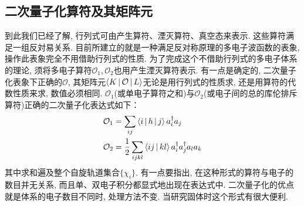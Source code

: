 \subsection{二次量子化算符及其矩阵元}
\label{sec2.4.2}
到此我们已经了解, 行列式可由产生算符、湮灭算符、真空态来表示. 这些算符满足一组反対易关系. 目前所建立的就是一种满足反对称原理的多电子波函数的表象, 操作此表象完全不用借助行列式的性质. 为了完成这个不借助行列式的多电子体系的理论, 须将多电子算符$\mathcal{O}_1,\mathcal{O}_2$也用产生湮灭算符表示. 有一点是确定的, 二次量子化表象下正确的$\mathcal{O}$, 其矩阵元$\Braket{K|\mathcal{O}|L}$无论是用行列式的性质求, 还是用算符的代数性质来求, 数值必须相同. $\mathcal{O}_1$(或单电子算符之和)与$\mathcal{O}_2$(或电子间的总的库伦排斥算符)正确的二次量子化表达式如下：
\begin{align}
\mathcal{O}_1 & = \sum_{ij} \Braket{i|h|j}a^\dagger_ia_j\\
\mathcal{O}_2 & = \frac{1}{2}\sum_{ijkl}\Braket{ij|kl}a^\dagger_ia^\dagger_ja_la_k
\end{align}
其中求和遍及整个自旋轨道集合$\{\chi_i\}$. 有一点要指出, 在这种形式的算符与电子的数目并无关系, 而且单、双电子积分都显式地出现在表达式中. 二次量子化的优点就是体系的电子数目不同时, 处理方法不变. 当研究固体时这个形式有很大便利.

